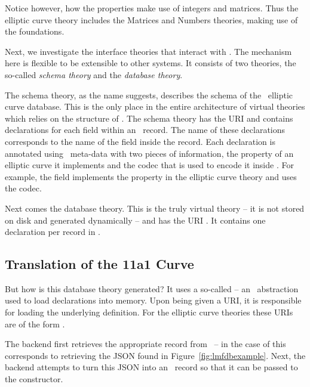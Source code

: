 Notice however, how the properties make use of integers and matrices. 
Thus the elliptic curve theory includes the Matrices and Numbers theories, making use of the foundations. 

Next, we investigate the interface theories that interact with \lmfdb. 
The mechanism here is flexible to be extensible to other systems. 
It consists of two theories, the so-called \textit{schema theory} and the \textit{database theory}. 

The schema theory, as the name suggests, describes the schema of the \lmfdb\ elliptic curve database. 
This is the only place in the entire architecture of virtual theories which relies on the structure of \lmfdb. 
The schema theory has the URI  and contains declarations for each field within an \lmfdb\ record. 
The name of these declarations corresponds to the name of the field inside the record. 
Each declaration is annotated using \mmt\ meta-data with two pieces of information, the property of an elliptic curve it implements and the codec that is used to encode it inside \lmfdb. 
For example, the  field implements the  property in the elliptic curve theory and uses the  codec. 

Next comes the database theory. 
This is the truly virtual theory -- it is not stored on disk and generated dynamically -- and has the URI .
It contains one declaration per record in \lmfdb. 

\subsection{Translation of the 11a1 Curve}\label{sec:vt:11a1}

But how is this database theory generated?
It uses a so-called  -- an \mmt\ abstraction used to load declarations into memory. 
Upon being given a URI, it is responsible for loading the underlying definition.
For the elliptic curve theories these URIs are of the form . 

The backend first retrieves the appropriate record from \lmfdb\ -- in the case of  this corresponds to retrieving the JSON found in Figure~\ref{fig:lmfdbexample}. 
Next, the backend attempts to turn this JSON into an \mmt\ record so that it can be passed to the  constructor. 

